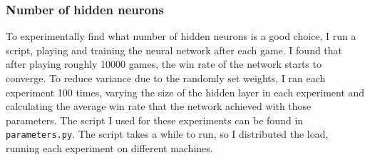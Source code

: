 \documentclass{article}
\begin{document}
\subsubsection{Number of hidden neurons}
To experimentally find what number of hidden neurons is a good choice, I run a script, playing and training the neural network after each game. I found that after playing roughly 10000 games, the win rate of the network starts to converge. To reduce variance due to the randomly set weights, I ran each experiment 100 times, varying the size of the hidden layer in each experiment and calculating the average win rate that the network achieved with those parameters. The script I used for these experiments can be found in \texttt{parameters.py}. The script takes a while to run, so I distributed the load, running each experiment on different machines.
\end{document}
